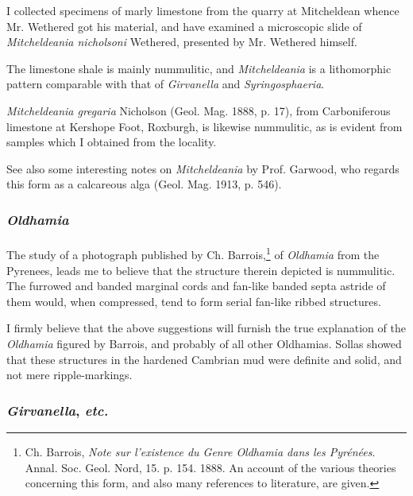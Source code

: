 \documentclass[a4paper, 12pt, oneside]{article}
\begin{document}
I collected specimens of marly limestone from the quarry at Mitcheldean whence Mr. Wethered got his material, and have examined a microscopic slide of \emph{Mitcheldeania nicholsoni} Wethered, presented by Mr. Wethered himself.

The limestone shale is mainly nummulitic, and \emph{Mitcheldeania} is a lithomorphic pattern comparable with that of \emph{Girvanella} and \emph{Syringosphaeria}.

\emph{Mitcheldeania gregaria} Nicholson (Geol. Mag. 1888, p. 17), from Carboniferous limestone at Kershope Foot, Roxburgh, is likewise nummulitic, as is evident from samples which I obtained from the locality.

See also some interesting notes on \emph{Mitcheldeania} by Prof. Garwood, who regards this form as a calcareous alga (Geol. Mag. 1913, p. 546).

\subsubsection{\emph{Oldhamia}}
\paragraph{}
The study of a photograph published by Ch. Barrois,\footnote{Ch. Barrois, \emph{Note sur l'existence du Genre \emph{Oldhamia} dans les Pyrénées}. Annal. Soc. Geol. Nord, 15. p. 154. 1888. An account of the various theories concerning this form, and also many references to literature, are given.} of \emph{Oldhamia} from the Pyrenees, leads me to believe that the structure therein depicted is nummulitic. The furrowed and banded marginal cords and fan-like banded septa astride of them would, when compressed, tend to form serial fan-like ribbed structures.

I firmly believe that the above suggestions will furnish the true explanation of the \emph{Oldhamia} figured by Barrois, and probably of all other Oldhamias. Sollas showed that these structures in the hardened Cambrian mud were definite and solid, and not mere ripple-markings.

\subsubsection{\emph{Girvanella}, \emph{etc.}}
\end{document}
